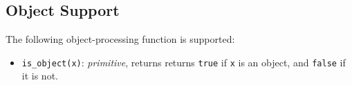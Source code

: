 \subsection*{Object Support}

The following object-processing function is supported:

\begin{itemize}
\item \lstinline{is_object(x)}: \textit{primitive}, returns
  returns \texttt{true} if \texttt{x} is an object, and \texttt{false} if it is not.
\end{itemize}

  


